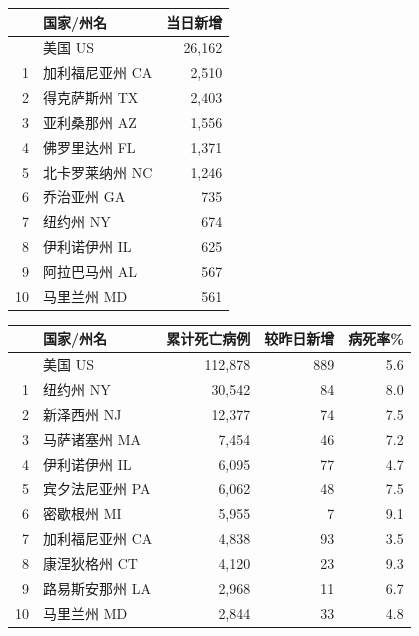 \documentclass[
]{article}
\begin{document}
\begin{table}[H]
    \vspace{-7mm}
    \begin{minipage}{.4\linewidth}
    \caption{美国新增确诊前十位州}
    \vspace{-0.5\baselineskip}
      \centering
    \captionsetup{justification=centering} \begin{table}[H]
\centering
\begin{tabular}{rlr}
\toprule
  & 国家/州名 & 当日新增\\
\midrule
\rowcolor{gray!6}   & 美国 US & 26,162\\
1 & 加利福尼亚州 CA & 2,510\\
\rowcolor{gray!6}  2 & 得克萨斯州 TX & 2,403\\
3 & 亚利桑那州 AZ & 1,556\\
\rowcolor{gray!6}  4 & 佛罗里达州 FL & 1,371\\
5 & 北卡罗莱纳州 NC & 1,246\\
\rowcolor{gray!6}  6 & 乔治亚州 GA & 735\\
7 & 纽约州 NY & 674\\
\rowcolor{gray!6}  8 & 伊利诺伊州 IL & 625\\
9 & 阿拉巴马州 AL & 567\\
\rowcolor{gray!6}  10 & 马里兰州 MD & 561\\
\bottomrule
\end{tabular}
\end{table} \end{minipage}%
    \begin{minipage}{.6\linewidth}
     \caption{美国累计死亡前十位州}
     \vspace{-0.5\baselineskip}
      \centering
    \captionsetup{justification=centering} \begin{table}[H]
\centering
\begin{tabular}{rlrrr}
\toprule
  & 国家/州名 & 累计死亡病例 & 较昨日新增 & 病死率\%\\
\midrule
\rowcolor{gray!6}   & 美国 US & 112,878 & 889 & 5.6\\
1 & 纽约州 NY & 30,542 & 84 & 8.0\\
\rowcolor{gray!6}  2 & 新泽西州 NJ & 12,377 & 74 & 7.5\\
3 & 马萨诸塞州 MA & 7,454 & 46 & 7.2\\
\rowcolor{gray!6}  4 & 伊利诺伊州 IL & 6,095 & 77 & 4.7\\
5 & 宾夕法尼亚州 PA & 6,062 & 48 & 7.5\\
\rowcolor{gray!6}  6 & 密歇根州 MI & 5,955 & 7 & 9.1\\
7 & 加利福尼亚州 CA & 4,838 & 93 & 3.5\\
\rowcolor{gray!6}  8 & 康涅狄格州 CT & 4,120 & 23 & 9.3\\
9 & 路易斯安那州 LA & 2,968 & 11 & 6.7\\
\rowcolor{gray!6}  10 & 马里兰州 MD & 2,844 & 33 & 4.8\\
\bottomrule
\end{tabular}
\end{table} \end{minipage} 
\end{table}
\end{document}
